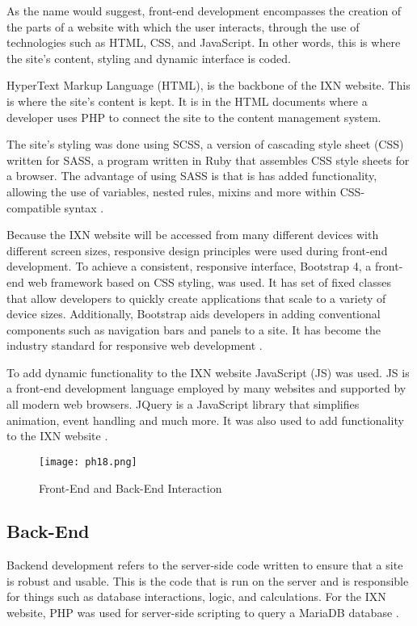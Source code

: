 \documentclass[fontsize=11pt]{extarticle}
\numberwithin{figure}{section} %
\begin{document}
As the name would suggest, front-end development encompasses the
creation of the parts of a website with which the user interacts,
through the use of technologies such as HTML, CSS, and JavaScript. In
other words, this is where the site's content, styling and dynamic
interface is coded.

HyperText Markup Language (HTML), is the backbone of the IXN website.
This is where the site's content is kept. It is in the HTML documents
where a developer uses PHP to connect the site to the content management
system.

The site's styling was done using SCSS, a version of cascading style
sheet (CSS) written for SASS, a program written in Ruby that assembles
CSS style sheets for a browser. The advantage of using SASS is that is
has added functionality, allowing the use of variables, nested rules,
mixins and more within CSS-compatible syntax \cite{p14}.

Because the IXN website will be accessed from many different devices
with different screen sizes, responsive design principles were used
during front-end development. To achieve a consistent, responsive
interface, Bootstrap 4, a front-end web framework based on CSS styling,
was used. It has set of fixed classes that allow developers to quickly
create applications that scale to a variety of device sizes.
Additionally, Bootstrap aids developers in adding conventional
components such as navigation bars and panels to a site. It has become
the industry standard for responsive web development \cite{p15}.

To add dynamic functionality to the IXN website JavaScript (JS) was
used. JS is a front-end development language employed by many websites
and supported by all modern web browsers. JQuery is a JavaScript library
that simplifies animation, event handling and much more. It was also
used to add functionality to the IXN website \cite{p16}.

\begin{figure}[H]
      \centering
      \texttt{[image: ph18.png]}
      \caption{Front-End and Back-End Interaction}
 \end{figure}

\hypertarget{back-end}{%
\subsection{Back-End}\label{back-end}}

Backend development refers to the server-side code written to ensure
that a site is robust and usable. This is the code that is run on the
server and is responsible for things such as database interactions,
logic, and calculations. For the IXN website, PHP was used for
server-side scripting to query a MariaDB database \cite{p17}.
\end{document}
